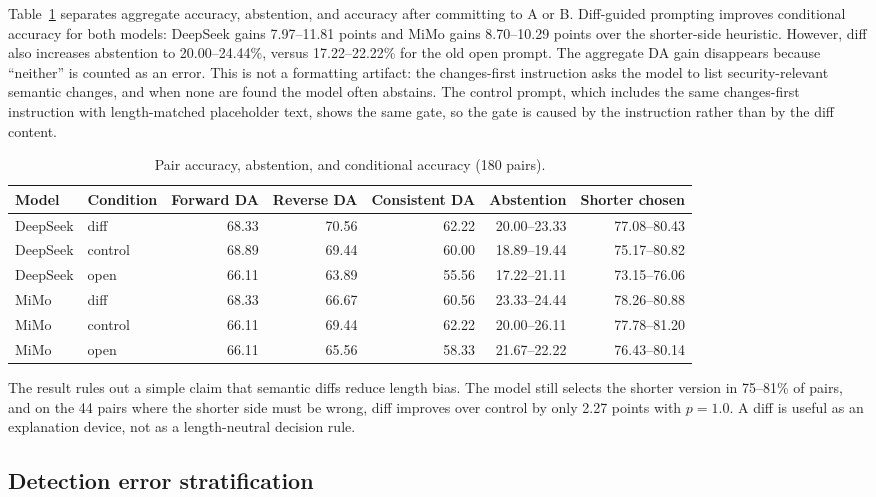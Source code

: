 \documentclass[conference]{IEEEtran}
\begin{document}
Table~\ref{tab:pairdetail} separates aggregate accuracy, abstention, and accuracy after committing to A or B. Diff-guided prompting improves conditional accuracy for both models: DeepSeek gains 7.97--11.81 points and MiMo gains 8.70--10.29 points over the shorter-side heuristic. However, diff also increases abstention to 20.00--24.44\%, versus 17.22--22.22\% for the old open prompt. The aggregate DA gain disappears because ``neither'' is counted as an error. This is not a formatting artifact: the changes-first instruction asks the model to list security-relevant semantic changes, and when none are found the model often abstains. The control prompt, which includes the same changes-first instruction with length-matched placeholder text, shows the same gate, so the gate is caused by the instruction rather than by the diff content.

\begin{table}[t]
\centering
\caption{Pair accuracy, abstention, and conditional accuracy (180 pairs).}
\label{tab:pairdetail}
\footnotesize
\setlength{\tabcolsep}{4pt}
\begin{tabular}{@{}llrrrrr@{}}
\toprule
Model & Condition & Forward DA & Reverse DA & Consistent DA & Abstention & Shorter chosen \\
\midrule
DeepSeek & diff & 68.33 & 70.56 & 62.22 & 20.00--23.33 & 77.08--80.43 \\
DeepSeek & control & 68.89 & 69.44 & 60.00 & 18.89--19.44 & 75.17--80.82 \\
DeepSeek & open & 66.11 & 63.89 & 55.56 & 17.22--21.11 & 73.15--76.06 \\
MiMo & diff & 68.33 & 66.67 & 60.56 & 23.33--24.44 & 78.26--80.88 \\
MiMo & control & 66.11 & 69.44 & 62.22 & 20.00--26.11 & 77.78--81.20 \\
MiMo & open & 66.11 & 65.56 & 58.33 & 21.67--22.22 & 76.43--80.14 \\
\bottomrule
\end{tabular}
\end{table}

The result rules out a simple claim that semantic diffs reduce length bias. The model still selects the shorter version in 75--81\% of pairs, and on the 44 pairs where the shorter side must be wrong, diff improves over control by only 2.27 points with $p=1.0$. A diff is useful as an explanation device, not as a length-neutral decision rule.

\subsection{Detection error stratification}
\end{document}
